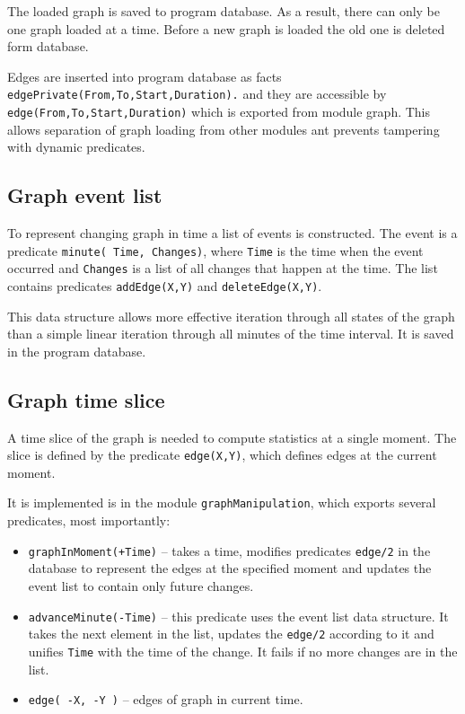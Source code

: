 \documentclass[11pt, a4paper]{article}
\newcommand{\pl}[1]{\texttt{#1}} %
\theoremstyle{plain}
\theoremstyle{definition}
\theoremstyle{remark}
\begin{document}
The loaded graph is saved to program database. 
As a result, there can only be one graph loaded at a time. 
Before a new graph is loaded the old one is deleted form database.

Edges are inserted into program database as facts
\pl{edgePrivate(From,To,Start,Duration).}
and they are accessible by \pl{edge(From,To,Start,Duration)} which is
exported from module graph. This allows separation of graph loading
from other modules ant prevents tampering with dynamic predicates.


 
\subsection{Graph event list}
\label{sec:computing-eventlist}

To represent changing graph in time a list of events is constructed.
The event is a predicate \pl{minute( Time, Changes)}, 
where \pl{Time} is the time when the event occurred and
\pl{Changes} is a list of all changes that happen at the time.
The list contains predicates \pl{addEdge(X,Y)} and \pl{deleteEdge(X,Y)}.

This data structure allows more effective iteration through all states of the graph than a simple linear iteration through all minutes of the time interval. 
It is saved in the program database.

\subsection{Graph time slice}
\label{sec:computing-graphSlice}

A time slice of the graph is needed to compute statistics at a single moment. 
The slice is defined by the predicate \pl{edge(X,Y)}, which defines edges at the current moment. 

It is implemented is in the module \pl{graphManipulation}, which exports several
predicates, most importantly:
\begin{itemize}
\item \pl{graphInMoment(+Time)} -- takes a time, modifies predicates
	\pl{edge/2} in the database to represent the edges at the specified 
	moment and updates the event list to contain only future changes.
	
\item \pl{advanceMinute(-Time)} -- this predicate uses the event list data
	 structure. It takes the next element in the list, updates the
	 \pl{edge/2} according to it and unifies \pl{Time} with the time of
	 the change.
It fails if no more changes are in the list.
\item \pl{edge( -X, -Y )} -- edges of graph in current time.
\end{itemize} 
\end{document}

